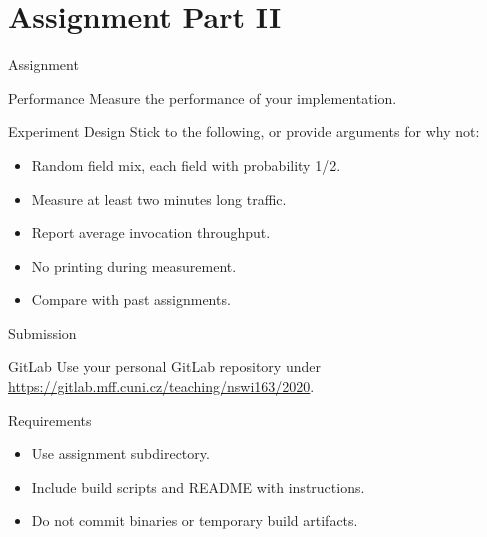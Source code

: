 \section{Assignment Part II}


\begin{frame}{Assignment}
    \begin{block}{Performance}
        Measure the performance of your implementation.
    \end{block}

    \bigskip

    \begin{block}{Experiment Design}
        Stick to the following, or provide arguments for why not:
        \begin{itemize}
            \item Random field mix, each field with probability 1/2.
            \item Measure at least two minutes long traffic.
            \item Report average invocation throughput.
            \item No printing during measurement.
            \item Compare with past assignments.
        \end{itemize}
    \end{block}
\end{frame}


\begin{frame}{Submission}
    \begin{block}{GitLab}
        Use your personal GitLab repository under \\
        \url{https://gitlab.mff.cuni.cz/teaching/nswi163/2020}.
    \end{block}
    \begin{block}{Requirements}
        \begin{itemize}
            \item Use assignment subdirectory.
            \item Include build scripts and README with instructions.
            \item Do not commit binaries or temporary build artifacts.
        \end{itemize}
    \end{block}
\end{frame}

